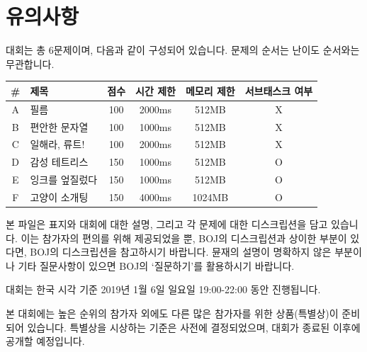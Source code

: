 \documentclass{article}
\begin{document}
\section{유의사항}
대회는 총 6문제이며, 다음과 같이 구성되어 있습니다. 문제의 순서는 난이도 순서와는 무관합니다. \newline

\sf \large
\begin{tabular}{|c l c c c c|}
	\hline
	\# & 제목 & 점수 & 시간 제한 & 메모리 제한 & 서브태스크 여부 \\
	\hline
	A & 필름 & 100 & 2000ms & 512MB & X \\
	B & 편안한 문자열 & 100 & 1000ms & 512MB & X \\
	C & 일해라, 류트! & 100 & 2000ms & 512MB & X \\
	D & 감성 테트리스 & 150 & 1000ms & 512MB & O \\
	E & 잉크를 엎질렀다 & 150 & 1000ms & 512MB & O \\
	F & 고양이 소개팅 & 150 & 4000ms & 1024MB & O \\
	\hline
\end{tabular}

\normalsize
\normalfont

\vspace{1.0cm}

본 파일은 표지와 대회에 대한 설명, 그리고 각 문제에 대한 디스크립션을 담고 있습니다. 이는 참가자의 편의를 위해 제공되었을 뿐, BOJ의 디스크립션과 상이한 부분이 있다면, BOJ의 디스크립션을 참고하시기 바랍니다. 뮨재의 설명이 명확하지 않은 부분이나 기타 질문사항이 있으면 BOJ의 `질문하기'를 활용하시기 바랍니다.\newline

대회는 한국 시각 기준 2019년 1월 6일 일요일 19:00-22:00 동안 진행됩니다.\newline

본 대회에는 높은 순위의 참가자 외에도 다른 많은 참가자를 위한 상품(특별상)이 준비되어 있습니다. 특별상을 시상하는 기준은 사전에 결정되었으며, 대회가 종료된 이후에 공개할 예정입니다.

\vspace{1.0cm}
\end{document}
